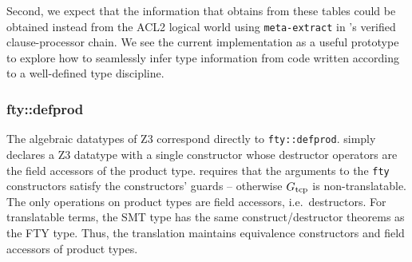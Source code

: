 Second, we expect that the information that \smtlink{} obtains from these tables could
be obtained instead from the ACL2 logical world using \texttt{meta-extract} in
\smtlink{}'s verified clause-processor chain.  We see the current implementation
as a useful prototype to explore how to seamlessly infer type information from
code written according to a well-defined type discipline.

\subsubsection{fty::defprod}
The algebraic datatypes of Z3 correspond directly to \texttt{fty::defprod}.
\smtlink{} simply declares a Z3 datatype with a single constructor whose
destructor operators are the field accessors of the product type.
\smtlink{} requires that the arguments to the \texttt{fty} constructors satisfy
the constructors' guards -- otherwise $G_{\mathrm{tcp}}$ is non-translatable.
The only operations on product types are field accessors, i.e.\ destructors.
For translatable terms, the SMT type has the same construct/destructor theorems
as the FTY type.  Thus, the \smtlink{} translation maintains equivalence
constructors and field accessors of product types.

